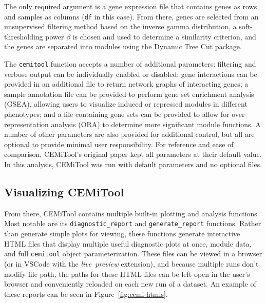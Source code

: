 \noindent The only required argument is a gene expression file that contains genes as rows and samples as columns (\texttt{df} in this case). From there, genes are selected from an unsupervised filtering method based on the inverse gamma distribution, a soft-thresholding power $\beta$ is chosen and used to determine a similarity criterion, and the genes are separated into modules using the Dynamic Tree Cut package.~\cite{cem}

The \texttt{cemitool} function accepts a number of additional parameters: filtering and verbose output can be individually enabled or disabled; gene interactions can be provided in an additional file to return network graphs of interacting genes; a sample annotation file can be provided to perform gene set enrichment analysis (GSEA), allowing users to visualize induced or repressed modules in different phenotypes; and a file containing gene sets can be provided to allow for over-representation analysis (ORA) to determine more significant module functions. A number of other parameters are also provided for additional control, but all are optional to provide minimal user responsibility. For reference and ease of comparison, CEMiTool's original paper kept all parameters at their default value. In this analysis, CEMiTool was run with default parameters and no optional files.

\subsection{Visualizing CEMiTool}
\label{subsec: visualizing}
From there, CEMiTool contains multiple built-in plotting and analysis functions. Most notable are its \texttt{diagnostic\_report} and \texttt{generate\_report} functions. Rather than generate simple plots for viewing, these functions generate interactive HTML files that display multiple useful diagnostic plots at once, module data, and full \texttt{cemitool} object parameterization. These files can be viewed in a browser (or in VSCode with the \emph{live\ preview} extension), and because multiple runs don't modify file path, the paths for these HTML files can be left open in the user's browser and conveniently reloaded on each new run of a dataset. An example of these reports can be seen in Figure~\ref{fig:cemi-htmls}.

